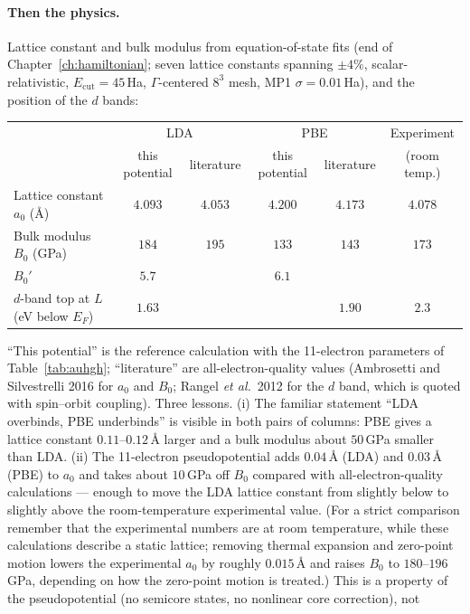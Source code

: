 \paragraph{Then the physics.} Lattice constant and bulk modulus from
equation-of-state fits (end of Chapter~\ref{ch:hamiltonian}; seven
lattice constants spanning $\pm4\%$, scalar-relativistic,
$E_{\mathrm{cut}} = 45$\,Ha, $\Gamma$-centered $8^3$ mesh, MP1
$\sigma = 0.01$\,Ha), and the position of the $d$ bands:
\begin{center}\small\setlength{\tabcolsep}{4pt}
\begin{tabular}{@{}lccccc@{}}
\toprule
 & \multicolumn{2}{c}{LDA} & \multicolumn{2}{c}{PBE} & Experiment\\
 & this potential & literature & this potential & literature & (room temp.)\\
\midrule
Lattice constant $a_0$ (\AA) & $4.093$ & $4.053$ & $4.200$ & $4.173$ & $4.078$\\
Bulk modulus $B_0$ (GPa) & $184$ & $195$ & $133$ & $143$ & $173$\\
$B_0'$ & $5.7$ & & $6.1$ & & \\
$d$-band top at $L$ (eV below $E_F$) & $1.63$ & & & $1.90$ & $2.3$\\
\bottomrule
\end{tabular}
\end{center}
``This potential'' is the reference calculation with the 11-electron
parameters of Table~\ref{tab:auhgh}; ``literature'' are
all-electron-quality values (Ambrosetti and Silvestrelli 2016 for $a_0$
and $B_0$; Rangel \emph{et al.}\ 2012 for the $d$ band, which is quoted
with spin--orbit coupling). Three lessons.
(i) The familiar statement ``LDA overbinds, PBE underbinds'' is visible in
both pairs of columns: PBE gives a lattice constant $0.11$--$0.12$\,\AA{}
larger and a bulk modulus about $50$\,GPa smaller than LDA. (ii) The
11-electron pseudopotential adds $0.04$\,\AA{} (LDA) and $0.03$\,\AA{} (PBE)
to $a_0$ and takes
about $10$\,GPa off $B_0$ compared with all-electron-quality
calculations --- enough to move the LDA lattice constant from slightly
below to slightly above the room-temperature experimental value. (For a
strict comparison remember that the experimental numbers are at room
temperature, while these calculations describe a static lattice; removing
thermal expansion and zero-point motion lowers the experimental $a_0$ by
roughly $0.015$\,\AA{} and raises $B_0$ to $180$--$196$\,GPa, depending on
how the zero-point motion is treated.) This is a property of the
pseudopotential (no semicore states, no nonlinear core correction), not
